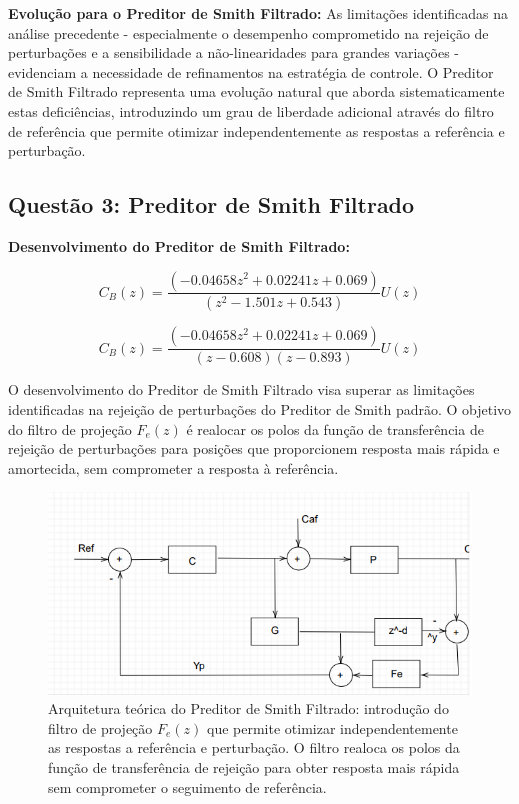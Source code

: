 \documentclass[a4paper,12pt]{article}
\begin{document}
\textbf{Evolução para o Preditor de Smith Filtrado:} As limitações identificadas na análise precedente - especialmente o desempenho comprometido na rejeição de perturbações e a sensibilidade a não-linearidades para grandes variações - evidenciam a necessidade de refinamentos na estratégia de controle. O Preditor de Smith Filtrado representa uma evolução natural que aborda sistematicamente estas deficiências, introduzindo um grau de liberdade adicional através do filtro de referência que permite otimizar independentemente as respostas a referência e perturbação.

\subsection{Questão 3: Preditor de Smith Filtrado}

\textbf{Desenvolvimento do Preditor de Smith Filtrado:}

\begin{equation}
C_{B}(z) = \frac{(-0.04658z^2 + 0.02241z + 0.069)}{(z^2 - 1.501z + 0.543)} U(z)
\end{equation}

\begin{equation}
C_{B}(z) =  \frac{(-0.04658z^2 + 0.02241z + 0.069)}{(z-0.608)(z-0.893)} U(z)
\end{equation}

O desenvolvimento do Preditor de Smith Filtrado visa superar as limitações identificadas na rejeição de perturbações do Preditor de Smith padrão. O objetivo do filtro de projeção $F_e(z)$ é realocar os polos da função de transferência de rejeição de perturbações para posições que proporcionem resposta mais rápida e amortecida, sem comprometer a resposta à referência.


\begin{figure} [h]
    \centering
    \includegraphics[width=0.8\linewidth]{image1.png}
    \caption{Arquitetura teórica do Preditor de Smith Filtrado: introdução do filtro de projeção $F_e(z)$ que permite otimizar independentemente as respostas a referência e perturbação. O filtro realoca os polos da função de transferência de rejeição para obter resposta mais rápida sem comprometer o seguimento de referência.}
    \label{fig:psf_architecture}
\end{figure}
\end{document}
